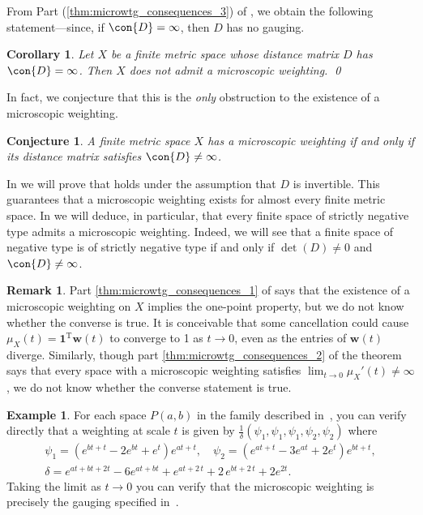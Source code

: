 \documentclass[a4paper, oneside, reqno]{amsart}
\newtheorem{cor}[theorem]{Corollary}
\newtheorem{conj}[theorem]{Conjecture}
\theoremstyle{definition}
\newtheorem{example}[theorem]{Example}
\newtheorem{remark}[theorem]{Remark}
\theoremstyle{remark}
\numberwithin{equation}{section}
\renewcommand{\vec}{\mathbf}
\newcommand{\onevector}{\mathbf{1}}
\newcommand{\transpose}{\mathrm{T}}
\begin{document}
From Part (\ref{thm:microwtg_consequences_3}) of , we obtain the following statement---since, if \(\con{D} = \infty\), then \(D\) has no gauging.

\begin{cor}
\label{cor:magD_zero_microweighting_does_not_exist}
    Let \(X\) be a finite metric space whose distance matrix \(D\) has \(\con{D} = \infty\). Then \(X\) does not admit a microscopic weighting. \qed
\end{cor}

In fact, we conjecture that this is the \emph{only} obstruction to the existence of a microscopic weighting.

\begin{conj}
\label{conj:magD_nonzero_microweighting_exists}
A finite metric space \(X\) has a microscopic weighting if and only if its distance matrix satisfies \(\con{D} \neq \infty\).
\end{conj}

In  we will prove that  holds under the assumption that \(D\) is invertible. This guarantees that a microscopic weighting exists for almost every finite metric space. In  we will deduce, in particular, that every finite space of strictly negative type admits a microscopic weighting. Indeed, we will see that a finite space of negative type is of strictly negative type if and only if \(\det(D) \neq 0\) and \(\con{D} \neq \infty\).

\begin{remark}
Part \eqref{thm:microwtg_consequences_1} of  says that the existence of a microscopic weighting on \(X\) implies the one-point property, but we do not know whether the converse is true. It is conceivable that some cancellation could cause \(\mu_X(t) = \onevector^\transpose \vec{w}(t)\) to converge to 1 as \(t \to 0\), even as the entries of \(\vec{w}(t)\) diverge. Similarly, though part \eqref{thm:microwtg_consequences_2} of the theorem says that every space with a microscopic weighting satisfies \(\lim_{t \to 0} \mu_X'(t) \neq \infty\), we do not know whether the converse statement is true.
\end{remark}

\begin{example}
    For each space \(P(a,b)\) in the family described in~, you can verify directly that a weighting at scale \(t\) is given by \(\tfrac{1}{\delta}(\psi_1, \psi_1, \psi_1, \psi_2, \psi_2)\) where
    \begin{gather*}
        \psi_1 = (e^{b t + t} - 2 e^{b t} + e^{t}) e^{a t + t},
        \quad
        \psi_2 = (e^{a t + t} - 3 e^{a t} + 2 e^{t}) e^{b t + t},
        \\
        \delta = e^{a t + b t + 2 t} - 6 e^{a t + b t} + e^{a t + 2 \, t} + 2 \, e^{b t + 2 \, t} + 2 e^{2 t}.
    \end{gather*}
    Taking the limit as \(t \to 0\) you can verify that the microscopic weighting is precisely the gauging specified in~.
\end{example}
\end{document}
